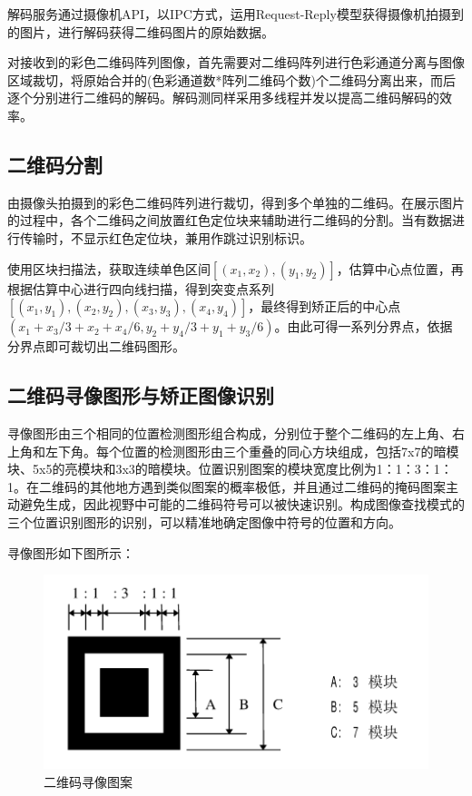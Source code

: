 解码服务通过摄像机API，以IPC方式，运用Request-Reply模型获得摄像机拍摄到的图片，进行解码获得二维码图片的原始数据。

对接收到的彩色二维码阵列图像，首先需要对二维码阵列进行色彩通道分离与图像区域裁切，将原始合并的(色彩通道数*阵列二维码个数)个二维码分离出来，而后逐个分别进行二维码的解码。解码测同样采用多线程并发以提高二维码解码的效率。

\subsection{二维码分割}

由摄像头拍摄到的彩色二维码阵列进行裁切，得到多个单独的二维码。在展示图片的过程中，各个二维码之间放置红色定位块来辅助进行二维码的分割。当有数据进行传输时，不显示红色定位块，兼用作跳过识别标识。

使用区块扫描法，获取连续单色区间$[(x_1,x_2),(y_1,y_2)]$，估算中心点位置，再根据估算中心进行四向线扫描，得到突变点系列$[(x_1,y_1),(x_2,y_2),(x_3,y_3),(x_4,y_4)]$，最终得到矫正后的中心点$(x_1+x_3/3+x_2+x_4/6,y_2+y_4/3+y_1+y_3/6)$。由此可得一系列分界点，依据分界点即可裁切出二维码图形。

\subsection{二维码寻像图形与矫正图像识别}

寻像图形由三个相同的位置检测图形组合构成，分别位于整个二维码的左上角、右上角和左下角。每个位置的检测图形由三个重叠的同心方块组成，包括7x7的暗模块、5x5的亮模块和3x3的暗模块。位置识别图案的模块宽度比例为1：1：3：1：1。在二维码的其他地方遇到类似图案的概率极低，并且通过二维码的掩码图案主动避免生成，因此视野中可能的二维码符号可以被快速识别。\cite{康春颖2009基于二维码技术的电子票务系统的研究}构成图像查找模式的三个位置识别图形的识别，可以精准地确定图像中符号的位置和方向。

寻像图形如下图所示：

\begin{figure}[!htbp]
\centering
\includegraphics[scale=1]{figures/PAT_b.png}
\caption{二维码寻像图案}
\end{figure}

